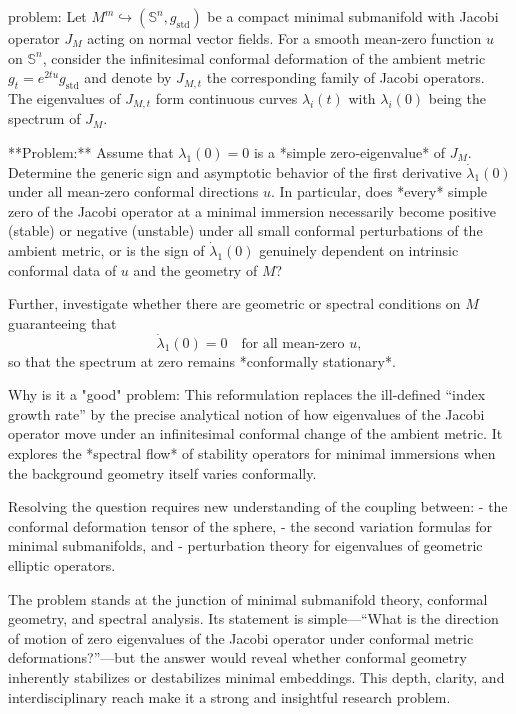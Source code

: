 problem:  
Let \(M^m \hookrightarrow (\mathbb{S}^n,g_{\mathrm{std}})\) be a compact minimal submanifold with Jacobi operator \(J_M\) acting on normal vector fields.  
For a smooth mean‑zero function \(u\) on \(\mathbb{S}^n\), consider the infinitesimal conformal deformation of the ambient metric \(g_t = e^{2t u}g_{\mathrm{std}}\) and denote by \(J_{M,t}\) the corresponding family of Jacobi operators.  The eigenvalues of \(J_{M,t}\) form continuous curves \(\lambda_i(t)\) with \(\lambda_i(0)\) being the spectrum of \(J_M\).  

**Problem:**  
Assume that \(\lambda_1(0)=0\) is a *simple zero‑eigenvalue* of \(J_M\).  Determine the generic sign and asymptotic behavior of the first derivative \(\dot \lambda_1(0)\) under all mean‑zero conformal directions \(u\).  
In particular, does *every* simple zero of the Jacobi operator at a minimal immersion necessarily become positive (stable) or negative (unstable) under all small conformal perturbations of the ambient metric, or is the sign of \(\dot\lambda_1(0)\) genuinely dependent on intrinsic conformal data of \(u\) and the geometry of \(M\)?  

Further, investigate whether there are geometric or spectral conditions on \(M\) guaranteeing that   
\[
\dot\lambda_1(0) = 0 \quad \text{for all mean‑zero } u,
\]
so that the spectrum at zero remains *conformally stationary*.  

Why is it a "good" problem:  
This reformulation replaces the ill‑defined “index growth rate” by the precise analytical notion of how eigenvalues of the Jacobi operator move under an infinitesimal conformal change of the ambient metric.  It explores the *spectral flow* of stability operators for minimal immersions when the background geometry itself varies conformally.  

Resolving the question requires new understanding of the coupling between:
- the conformal deformation tensor of the sphere,
- the second variation formulas for minimal submanifolds, and
- perturbation theory for eigenvalues of geometric elliptic operators.

The problem stands at the junction of minimal submanifold theory, conformal geometry, and spectral analysis.  Its statement is simple—“What is the direction of motion of zero eigenvalues of the Jacobi operator under conformal metric deformations?”—but the answer would reveal whether conformal geometry inherently stabilizes or destabilizes minimal embeddings.  This depth, clarity, and interdisciplinary reach make it a strong and insightful research problem.
